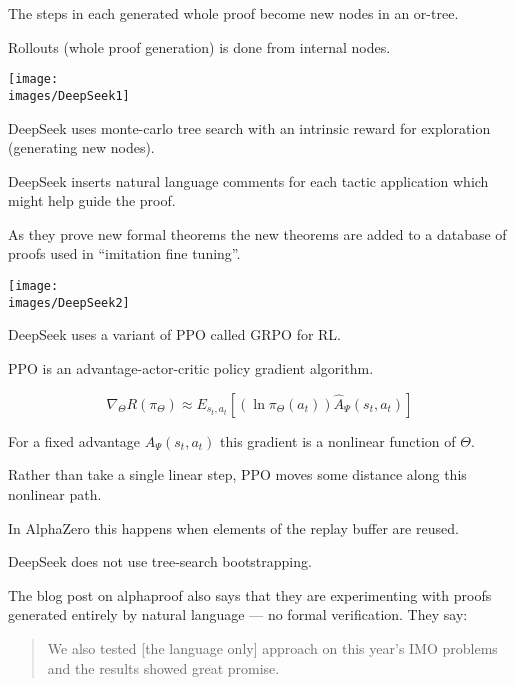 {\vfill
The steps in each generated whole proof become new nodes in an or-tree.

\vfill
Rollouts (whole proof generation) is done from internal nodes.


\centerline{\texttt{[image: \\images/DeepSeek1]}}


DeepSeek uses monte-carlo tree search with an intrinsic reward for exploration (generating new nodes).


\vfill
DeepSeek inserts natural language comments for each tactic application which might help guide the proof.


As they prove new formal theorems the new theorems are added to a database of proofs
used in ``imitation fine tuning''.

\vfill
\centerline{\texttt{[image: \\images/DeepSeek2]}}


DeepSeek uses a variant of PPO called GRPO for RL.

\vfill
PPO is an advantage-actor-critic policy gradient algorithm.

$$\nabla_\Theta R(\pi_\Theta) \approx E_{s_t,a_t}\left[(\ln \pi_\Theta(a_t)) \hat{A}_\Psi(s_t,a_t)\right]$$

\vfill
For a fixed advantage $\hat{A}_\Psi(s_t,a_t)$ this gradient is a nonlinear function of $\Theta$.

\vfill
Rather than take a single linear step, PPO moves some distance along this nonlinear path.

\vfill
In AlphaZero this happens when elements of the replay buffer are reused.

\vfill
DeepSeek does not use tree-search bootstrapping.



The blog post on alphaproof also says that they are experimenting with proofs generated entirely by natural language --- no formal verification.  They say:

\vfill

\begin{quotation}
We also tested [the language only] approach on this year’s IMO problems and the results showed great promise.
\end{quotation}

}
